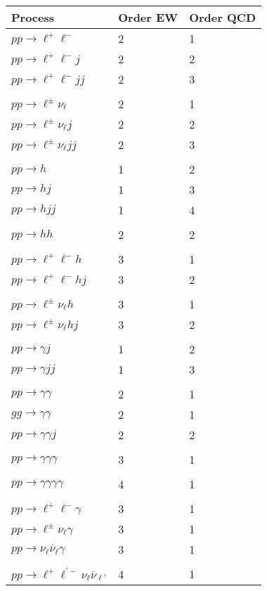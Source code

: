 \begin{longtable}[]{@{}lll@{}}
\toprule
Process & Order EW & Order QCD \\
\midrule
\endhead
\(pp\to \ell^+\ell^-\) & 2 & 1 \\
\(pp\to \ell^+\ell^- j\) & 2 & 2 \\
\(pp\to \ell^+\ell^- j j\) & 2 & 3 \\
& & \\
\(pp\to \ell^\pm\nu_\ell\) & 2 & 1 \\
\(pp\to \ell^\pm\nu_\ell j\) & 2 & 2 \\
\(pp\to \ell^\pm\nu_\ell j j\) & 2 & 3 \\
& & \\
\(pp\to h\) & 1 & 2 \\
\(pp\to h j\) & 1 & 3 \\
\(pp\to h j j\) & 1 & 4 \\
& & \\
\(pp\to h h\) & 2 & 2 \\
& & \\
\(pp\to \ell^+\ell^- h\) & 3 & 1 \\
\(pp\to \ell^+\ell^- h j\) & 3 & 2 \\
& & \\
\(pp\to \ell^\pm\nu_\ell h\) & 3 & 1 \\
\(pp\to \ell^\pm\nu_\ell h j\) & 3 & 2 \\
& & \\
\(pp\to \gamma j\) & 1 & 2 \\
\(pp\to \gamma j j\) & 1 & 3 \\
& & \\
\(pp\to \gamma \gamma\) & 2 & 1 \\
\(gg\to \gamma \gamma\) & 2 & 1 \\
\(pp\to \gamma \gamma j\) & 2 & 2 \\
& & \\
\(pp\to \gamma \gamma \gamma\) & 3 & 1 \\
& & \\
\(pp\to \gamma \gamma \gamma \gamma\) & 4 & 1 \\
& & \\
\(pp\to \ell^+\ell^-\gamma\) & 3 & 1 \\
\(pp\to \ell^\pm\nu_\ell\gamma\) & 3 & 1 \\
\(pp\to \nu_\ell\bar\nu_\ell\gamma\) & 3 & 1 \\
& & \\
\(pp\to \ell^+\ell^{\prime-}\nu_\ell\bar\nu_{\ell'}\) & 4 & 1 \\

\end{longtable}
